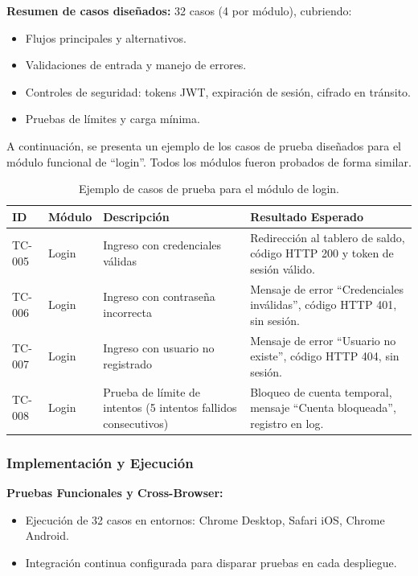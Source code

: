\documentclass[12pt]{article}
\begin{document}
\textbf{Resumen de casos diseñados:} 32 casos (4 por módulo), cubriendo:
\begin{itemize}
    \item Flujos principales y alternativos.
    \item Validaciones de entrada y manejo de errores.
    \item Controles de seguridad: tokens JWT, expiración de sesión, cifrado en tránsito.
    \item Pruebas de límites y carga mínima.
\end{itemize}

A continuación, se presenta un ejemplo de los casos de prueba diseñados para el módulo funcional de ``login''. Todos los módulos fueron probados de forma similar.

\begin{table}[h]
    \centering
    \begin{tabular}{llp{6cm}p{6cm}}
        \toprule
        \textbf{ID} & \textbf{Módulo} & \textbf{Descripción} & \textbf{Resultado Esperado} \\
        \midrule
        TC-005 & Login & Ingreso con credenciales válidas & Redirección al tablero de saldo, código HTTP 200 y token de sesión válido. \\
        TC-006 & Login & Ingreso con contraseña incorrecta & Mensaje de error ``Credenciales inválidas'', código HTTP 401, sin sesión. \\
        TC-007 & Login & Ingreso con usuario no registrado & Mensaje de error ``Usuario no existe'', código HTTP 404, sin sesión. \\
        TC-008 & Login & Prueba de límite de intentos (5 intentos fallidos consecutivos) & Bloqueo de cuenta temporal, mensaje ``Cuenta bloqueada'', registro en log. \\
        \bottomrule
    \end{tabular}
    \caption{Ejemplo de casos de prueba para el módulo de login.}
    \label{tab:casos_login}
\end{table}

\subsubsection{Implementación y Ejecución}

\textbf{Pruebas Funcionales y Cross-Browser:}
\begin{itemize}
    \item Ejecución de 32 casos en entornos: Chrome Desktop, Safari iOS, Chrome Android.
    \item Integración continua configurada para disparar pruebas en cada despliegue.
\end{itemize}
\end{document}
